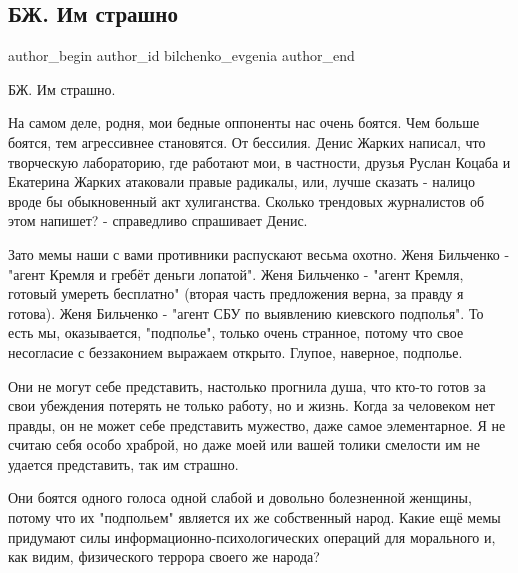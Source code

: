  
 
 
 
 
 
\subsection{БЖ. Им страшно}
\label{sec:26_07_2021.fb.bilchenko_evgenia.1.im_strashno}
 
\ifcmt
 author_begin
   author_id bilchenko_evgenia
 author_end
\fi

БЖ. Им страшно.

На самом деле, родня, мои бедные оппоненты нас очень боятся. Чем больше боятся,
тем агрессивнее становятся. От бессилия. Денис Жарких  написал, что творческую
лабораторию, где работают мои, в частности, друзья Руслан Коцаба  и Екатерина
Жарких  атаковали правые радикалы, или, лучше сказать - налицо вроде бы
обыкновенный акт хулиганства. Сколько трендовых журналистов об этом напишет? -
справедливо спрашивает Денис. 

Зато мемы наши с вами противники распускают весьма охотно. Женя Бильченко -
"агент Кремля и гребёт деньги лопатой". Женя Бильченко - "агент Кремля, готовый
умереть бесплатно" (вторая часть предложения верна, за правду я готова). Женя
Бильченко - "агент СБУ по выявлению киевского подполья". То есть мы,
оказывается, "подполье", только очень странное, потому что свое несогласие с
беззаконием выражаем открыто. Глупое, наверное, подполье. 

Они не могут себе представить, настолько прогнила душа, что кто-то готов за
свои убеждения потерять не только работу, но и жизнь. Когда за человеком нет
правды, он не может себе представить мужество, даже самое элементарное. Я не
считаю себя особо храброй, но даже моей или вашей толики смелости им не удается
представить, так им страшно. 

Они боятся одного голоса одной слабой и довольно болезненной женщины, потому
что их "подпольем" является их же собственный народ. Какие ещё мемы придумают
силы информационно-психологических операций для морального и, как видим,
физического террора своего же народа? 

